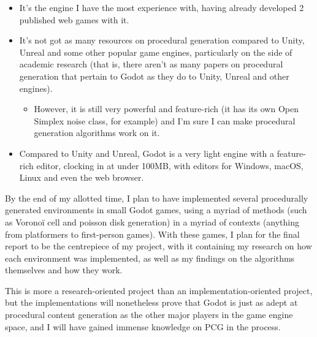 \begin{itemize}
	\item It's the engine I have the most experience with, having already developed 2 published web games with it.
	\item It's not got as many resources on procedural generation compared to Unity, Unreal and some other popular game engines, particularly on the side of academic research (that is, there aren't as many papers on procedural generation that pertain to Godot as they do to Unity, Unreal and other engines).
	\begin{itemize}
		\item However, it is still very powerful and feature-rich (it has its own Open Simplex noise class, for example) and I'm sure I can make procedural generation algorithms work on it.
	\end{itemize}
	\item Compared to Unity and Unreal, Godot is a very light engine with a feature-rich editor, clocking in at under 100MB, with editors for Windows, macOS, Linux and even the web browser. 
\end{itemize}

By the end of my allotted time, I plan to have implemented several procedurally generated environments in small Godot games, using a myriad of methods (such as Voronoï cell and poisson disk generation) in a myriad of contexts (anything from platformers to first-person games). With these games, I plan for the final report to be the centrepiece of my project, with it containing my research on how each environment was implemented, as well as my findings on the algorithms themselves and how they work.

This is more a research-oriented project than an implementation-oriented project, but the implementations will nonetheless prove that Godot is just as adept at procedural content generation as the other major players in the game engine space, and I will have gained immense knowledge on PCG in the process. 